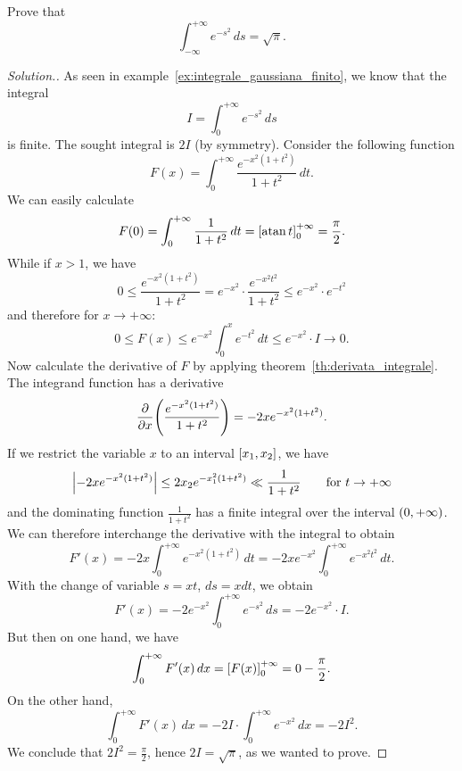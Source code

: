 \begin{exercise}
  \label{ex:integrale_gaussiana}%
Prove that 
\[
  \int_{-\infty}^{+\infty} e^{-s^2}\, ds = \sqrt \pi.
\]
\end{exercise}
%
\begin{proof}[Solution.]
As seen in example~\ref{ex:integrale_gaussiana_finito},
we know that the integral
\[
  I = \int_{0}^{+\infty} e^{-s^2}\, ds
\]
is finite. 
The sought integral is $2I$ (by symmetry).
Consider the following function
\[ 
  F(x) = \int_0^{+\infty} \frac{e^{-x^2(1+t^2)}}{1+t^2}\, dt.
\]
We can easily calculate 
\[
    F(0) = \int_0^{+\infty} \frac{1}{1+t^2}\, dt = {\left[ \operatorname{atan}
  t \right]}_0^{+\infty} = \frac \pi 2.
\]
While if $x>1$, we have 
\[
  0\le \frac{e^{-x^2(1+t^2)}}{1+t^2}
  = e^{-x^2}\cdot \frac{e^{-x^2t^2}}{1+t^2}
  \le e^{-x^2}\cdot e^{-t^2}
\]
and therefore for $x\to +\infty$:
\[
  0\le F(x) \le e^{-x^2} \int_0^x e^{-t^2}\, dt \le e^{-x^2}\cdot I \to 0.
\]
Now calculate the derivative of $F$ by applying
theorem~\ref{th:derivata_integrale}.
The integrand function has a derivative 
\[
 \frac{\partial}{\partial x}{\left( \frac{e^{-x^2(1+t^2)}}{1+t^2} \right)}
 = -2x e^{-x^2(1+t^2)}.
\]
If we restrict the variable $x$ to an interval $\left[x_1,x_2\right]$,
we have 
\[
 {\left|-2x e^{-x^2(1+t^2)}\right|}
 \le 2 x_2 e^{-x_1^2(1+t^2)} \ll \frac{1}{1+t^2}
 \qquad\text{for } t\to+\infty
\]
and the dominating function $\frac{1}{1+t^2}$ has a finite integral over the
interval
$\left(0,+\infty\right)$. 
We can therefore interchange the derivative with the integral to obtain 
\[
 F'(x) = - 2 x\int_0^{+\infty} e^{-x^2(1+t^2)}\, dt
       = - 2 x e^{-x^2}\int_0^{+\infty} e^{-x^2t^2}\, dt. 
\]
With the change of variable $s=xt$, $ds=x dt$, we obtain
\[
 F'(x) = -2 e^{-x^2}\int_0^{+\infty} e^{-s^2}\, ds = - 2 e^{-x^2}\cdot I.
\]
But then on one hand, we have 
\[
  \int_0^{+\infty} F'(x)\, dx 
  = {\left[ F(x) \right]}_0^{+\infty}  = 0 - \frac{\pi}{2}.
\]
On the other hand, 
\[
 \int_0^{+\infty} F'(x)\, dx 
 = - 2 I \cdot \int_0^{+\infty} e^{-x^2}\, dx
 = - 2 I^2. 
\]
We conclude that $2I^2 = \frac \pi 2$, hence 
$2I=\sqrt \pi$, as we wanted to prove.
\end{proof}

